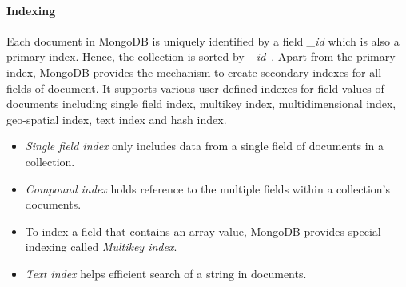 \paragraph{Indexing} 
Each document in MongoDB is uniquely identified by a field \textit{\_id} which is also a primary index. Hence, the collection is sorted by \textit{\_id}~\citep{nosql/comparision}.
Apart from the primary index, MongoDB provides the mechanism to create secondary indexes for all fields of document. It supports various user defined indexes for field values of documents including single field index, multikey index, multidimensional index, geo-spatial index, text index and hash index.
\begin{itemize}
\item \textit{Single field index} only includes data from a single field of documents in a collection.
\item \textit{Compound index} holds reference to the multiple fields within a collection's documents.
\item To index a field that contains an array value, MongoDB provides special indexing called \textit{Multikey index}.
\item \textit{Text index} helps efficient search of a string in documents.
\end{itemize}

